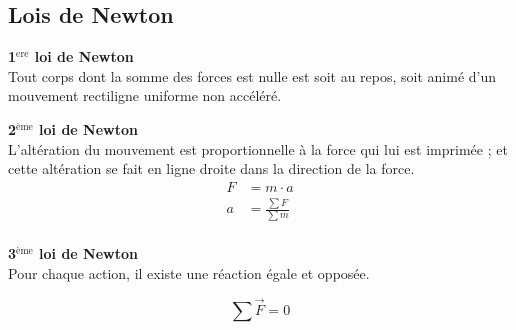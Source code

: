\documentclass[12pt,a4paper]{article} %
\newcommand\textsup[1]{\ensuremath{^{\textrm{#1}}}}
\begin{document}
\subsection{Lois de Newton}
\begin{mdframed}[leftmargin=2em, rightmargin=2em]
	\textbf{1\textsup{ere} loi de Newton} \\ \hspace{0.5em}
	Tout corps dont la somme des forces est nulle est soit au repos, soit animé d'un mouvement rectiligne uniforme non accéléré.
\end{mdframed}
\par\hspace{1em}
\begin{mdframed}[leftmargin=2em, rightmargin=2em]
	\textbf{2\textsup{ème} loi de Newton} \\ \hspace{0.5em}
	L'altération du mouvement est proportionnelle à la force qui lui est imprimée ; et cette altération se fait en ligne droite dans la direction de la force.	
	\begin{align*}
		F &= m \cdot a \\
		a &= \frac{\sum F}{\sum m} \\
	\end{align*}
\end{mdframed}
\par\hspace{1em}
\begin{mdframed}[leftmargin=2em, rightmargin=2em]
	\textbf{3\textsup{ème} loi de Newton} \\ \hspace{0.5em}
	Pour chaque action, il existe une réaction égale et opposée.

	\begin{equation*}
		\sum\overrightarrow{F} = 0
	\end{equation*}
\end{mdframed}

\newpage
\end{document}
